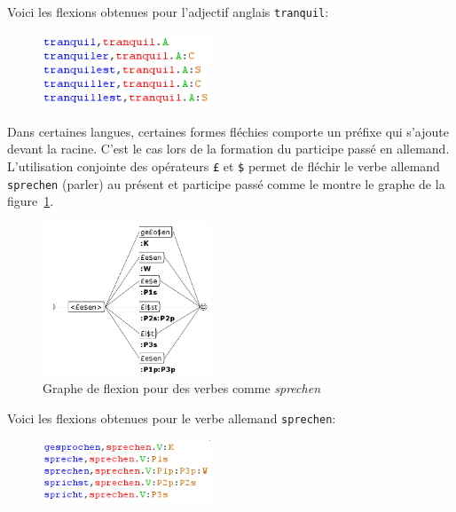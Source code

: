 \noindent Voici les flexions obtenues pour l'adjectif anglais \verb+tranquil+:

\bigskip
\begin{figure}[!ht]
\begin{center}
\includegraphics[width=5cm]{resources/img/fig3-flexion_tranquil.png}
\end{center}
\end{figure}

\noindent Dans certaines langues, certaines formes fléchies comporte un préfixe qui s'ajoute devant la racine.
C'est le cas lors de la formation du participe passé en allemand. L'utilisation conjointe des
opérateurs \verb+£+ et \verb+$+ permet de fléchir le verbe allemand \verb+sprechen+ (parler)
au présent et participe passé comme le montre le graphe de la figure~\ref{fig-inflection-sprechen}.

\newpage
\begin{figure}[!htbp]
\begin{center}
\includegraphics[width=5cm]{resources/img/fig3-Advanced_operators_with_Variables-V_sprechen.png}
\caption{Graphe de flexion pour des verbes comme {\it sprechen}
\label{fig-inflection-sprechen}}
\end{center}
\end{figure}

\noindent Voici les flexions obtenues pour le verbe allemand \verb+sprechen+:

\bigskip
\begin{figure}[!ht]
\begin{center}
\includegraphics[width=5cm]{resources/img/fig3-flexion_sprechen.png}
\end{center}
\end{figure}

